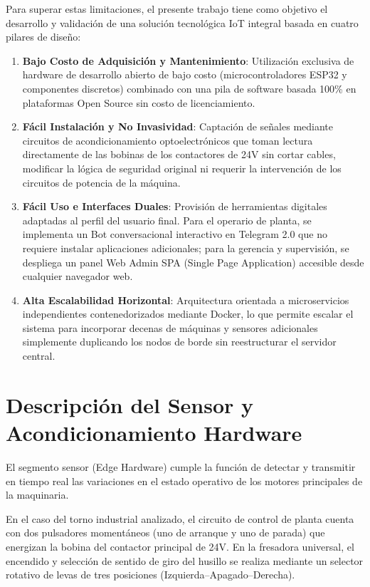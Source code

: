 \documentclass[11pt,a4paper]{article}
\begin{document}
Para superar estas limitaciones, el presente trabajo tiene como objetivo el desarrollo y validación de una solución tecnológica IoT integral basada en cuatro pilares de diseño:
\begin{enumerate}
    \item \textbf{Bajo Costo de Adquisición y Mantenimiento}: Utilización exclusiva de hardware de desarrollo abierto de bajo costo (microcontroladores ESP32 y componentes discretos) combinado con una pila de software basada 100\% en plataformas Open Source sin costo de licenciamiento.
    \item \textbf{Fácil Instalación y No Invasividad}: Captación de señales mediante circuitos de acondicionamiento optoelectrónicos que toman lectura directamente de las bobinas de los contactores de 24V sin cortar cables, modificar la lógica de seguridad original ni requerir la intervención de los circuitos de potencia de la máquina.
    \item \textbf{Fácil Uso e Interfaces Duales}: Provisión de herramientas digitales adaptadas al perfil del usuario final. Para el operario de planta, se implementa un Bot conversacional interactivo en Telegram 2.0 que no requiere instalar aplicaciones adicionales; para la gerencia y supervisión, se despliega un panel Web Admin SPA (Single Page Application) accesible desde cualquier navegador web.
    \item \textbf{Alta Escalabilidad Horizontal}: Arquitectura orientada a microservicios independientes contenedorizados mediante Docker, lo que permite escalar el sistema para incorporar decenas de máquinas y sensores adicionales simplemente duplicando los nodos de borde sin reestructurar el servidor central.
\end{enumerate}

\section{Descripción del Sensor y Acondicionamiento Hardware}

El segmento sensor (Edge Hardware) cumple la función de detectar y transmitir en tiempo real las variaciones en el estado operativo de los motores principales de la maquinaria. 

En el caso del torno industrial analizado, el circuito de control de planta cuenta con dos pulsadores momentáneos (uno de arranque y uno de parada) que energizan la bobina del contactor principal de 24V. En la fresadora universal, el encendido y selección de sentido de giro del husillo se realiza mediante un selector rotativo de levas de tres posiciones (Izquierda--Apagado--Derecha).
\end{document}
